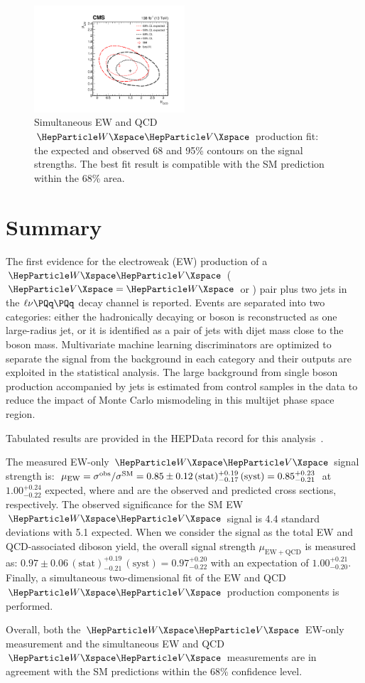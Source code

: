 \begin{figure}[!htb]
  \centering \includegraphics[width=0.5\textwidth]{Images/VBS_Studies/Figure_006.pdf} \caption{Simultaneous EW and QCD $\PW\PV$ production
    fit: the expected and observed 68 and 95\% \CL contours on the signal strengths. The best fit result is compatible
    with the SM prediction within the 68\% \CL area.  } \label{fig:fit_2d}
\end{figure}


\section{Summary}\label{sec:9}

The first evidence for the electroweak (EW) production of a $\PW\PV$ ($\PV = \PW$ or {\PZ}) pair plus two jets in the
$\ell\nu\PQq\PQq$ decay channel is reported.  Events are separated into two categories: either the hadronically decaying
{\PW} or {\PZ} boson is reconstructed as one large-radius jet, or it is identified as a pair of jets with dijet mass
close to the boson mass.  Multivariate machine learning discriminators are optimized to separate the signal from the
background in each category and their outputs are exploited in the statistical analysis.  The large background from
single {\PW} boson production accompanied by jets is estimated from control samples in the data to reduce the impact of
Monte Carlo mismodeling in this multijet phase space region.

Tabulated results are provided in the HEPData record for this analysis~\cite{HEPData_SMP-20-013}.

The measured EW-only $\PW\PV$ signal strength is:
$\mu_{\mathrm{EW}} = \sigma^{\text{obs}} / \sigma^{\text{SM}} = 0.85\pm0.12\,(\text{stat})^{+0.19}_{-0.17}\,(\text{syst}) = 0.85 ^{+0.23}_{-0.21} $
at $1.00^{+0.24}_{-0.22}$ expected, where \sobs and \ssm are the observed and predicted cross sections, respectively.
The observed significance for the SM EW $\PW\PV$ signal is 4.4 standard deviations with 5.1 expected.
When we consider the signal as the total EW and QCD-associated diboson yield, the overall signal strength
$\mu_{\mathrm{EW}+\mathrm{QCD}}$ is measured as: $0.97\pm0.06\,(\text{stat})^{+0.19}_{-0.21}\,(\text{syst}) = 0.97
^{+0.20}_{-0.22}$ with an expectation of $1.00^{+0.21}_{-0.20}$.  Finally, a simultaneous two-dimensional fit of the EW
and QCD $\PW\PV$ production components is performed.

Overall, both the $\PW\PV$ EW-only measurement and the simultaneous EW and QCD $\PW\PV$ measurements are in agreement
with the SM predictions within the 68\% confidence level.
